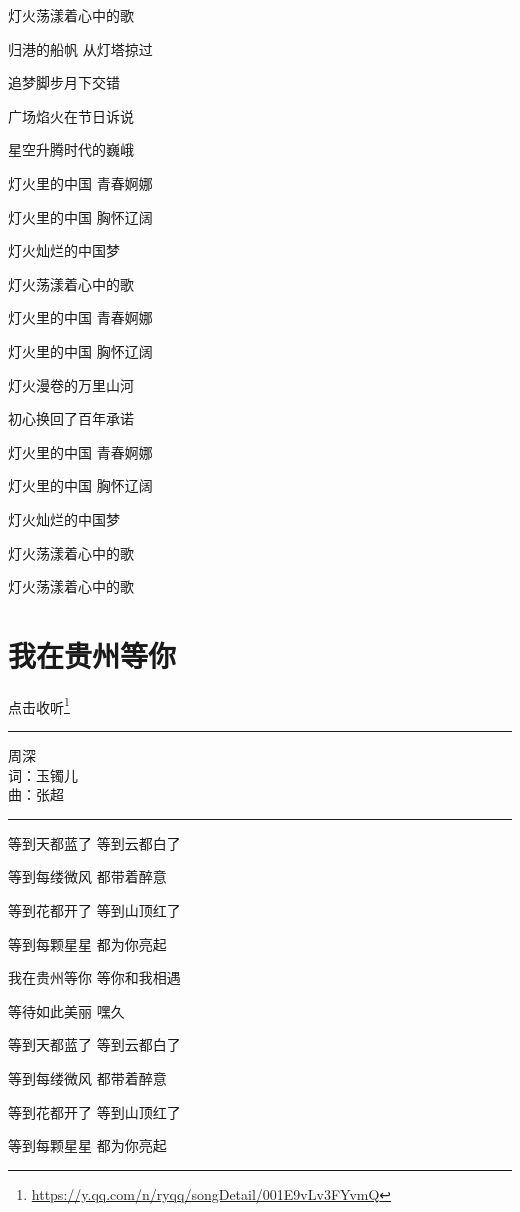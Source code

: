 \documentclass[]{ctexbook}
\renewcommand{\href}[2]{#2\footnote{\url{#1}}}
\begin{document}
灯火荡漾着心中的歌

归港的船帆 从灯塔掠过

追梦脚步月下交错

广场焰火在节日诉说

星空升腾时代的巍峨

灯火里的中国 青春婀娜

灯火里的中国 胸怀辽阔

灯火灿烂的中国梦

灯火荡漾着心中的歌

灯火里的中国 青春婀娜

灯火里的中国 胸怀辽阔

灯火漫卷的万里山河

初心换回了百年承诺

灯火里的中国 青春婀娜

灯火里的中国 胸怀辽阔

灯火灿烂的中国梦

灯火荡漾着心中的歌

灯火荡漾着心中的歌

\section*{我在贵州等你}\label{waitting-in-guizhou}


\href{https://y.qq.com/n/ryqq/songDetail/001E9vLv3FYvmQ}{点击收听}

\begin{center}\rule{0.5\linewidth}{0.5pt}\end{center}

周深\\
词：玉镯儿\\
曲：张超

\begin{center}\rule{0.5\linewidth}{0.5pt}\end{center}

等到天都蓝了 等到云都白了

等到每缕微风 都带着醉意

等到花都开了 等到山顶红了

等到每颗星星 都为你亮起

我在贵州等你 等你和我相遇

等待如此美丽 嘿久

等到天都蓝了 等到云都白了

等到每缕微风 都带着醉意

等到花都开了 等到山顶红了

等到每颗星星 都为你亮起
\end{document}
